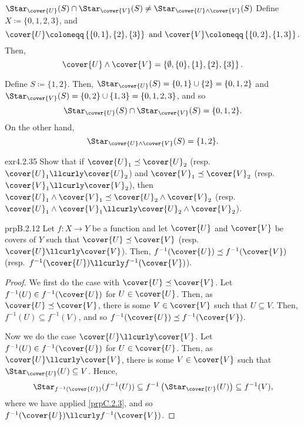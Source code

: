 \begin{exm}{$\Star _{\cover{U}}(S)\cap \Star _{\cover{V}}(S)\neq \Star _{\cover{U}\wedge \cover{V}}(S)$}{}
Define $X\coloneqq \{ 0,1,2,3\}$, and
\begin{equation}
\cover{U}\coloneqq \left\{ \{ 0,1\} ,\{ 2\} ,\{ 3\} \right\} \text{ and }\cover{V}\coloneqq \left\{ \{ 0,2\} ,\{ 1,3\} \right\} .
\end{equation}
Then,
\begin{equation}
\cover{U}\wedge \cover{V}=\left\{ \emptyset ,\{ 0\} ,\{ 1\} ,\{ 2\} ,\{ 3\} \right\} .
\end{equation}

Define $S\coloneqq \{ 1,2\}$.  Then, $\Star _{\cover{U}}(S)=\{ 0,1\} \cup \{ 2\} =\{ 0,1,2\}$ and $\Star _{\cover{V}}(S)=\{ 0,2\} \cup \{ 1,3\} =\{ 0,1,2,3\}$, and so
\begin{equation}
\Star _{\cover{U}}(S)\cap \Star _{\cover{V}}(S)=\{ 0,1,2\} .
\end{equation}
On the other hand,
\begin{equation}
\Star _{\cover{U}\wedge \cover{V}}(S)=\{ 1,2\} .
\end{equation}
\end{exm}
\begin{exr}{}{exr4.2.35}
Show that if $\cover{U}_1\preceq \cover{U}_2$ (resp.$\cover{U}_1\llcurly \cover{U}_2$) and $\cover{V}_1\preceq \cover{V}_2$ (resp.~$\cover{V}_1\llcurly \cover{V}_2$), then $\cover{U}_1\wedge \cover{V}_1\preceq \cover{U}_2\wedge \cover{V}_2$ (resp.~$\cover{U}_1\wedge \cover{V}_1\llcurly \cover{U}_2\wedge \cover{V}_2$).
\end{exr}
\begin{prp}{}{prpB.2.12}
Let $f\colon X\rightarrow Y$ be a function and let $\cover{U}$ and $\cover{V}$ be covers of $Y$ such that $\cover{U}\preceq \cover{V}$ (resp.~$\cover{U}\llcurly \cover{V}$).  Then, $f^{-1}(\cover{U})\preceq f^{-1}(\cover{V})$ (resp.~$f^{-1}(\cover{U})\llcurly f^{-1}(\cover{V})$).
\begin{proof}
We first do the case with $\cover{U}\preceq \cover{V}$.  Let $f^{-1}(U)\in f^{-1}(\cover{U})$ for $U\in \cover{U}$.  Then, as $\cover{U}\preceq \cover{V}$, there is some $V\in \cover{V}$ such that $U\subseteq V$.  Then, $f^{-1}(U)\subseteq f^{-1}(V)$, and so $f^{-1}(\cover{U})\preceq f^{-1}(\cover{V})$.

Now we do the case $\cover{U}\llcurly \cover{V}$.  Let $f^{-1}(U)\in f^{-1}(\cover{U})$ for $U\in \cover{U}$.  Then, as $\cover{U}\llcurly \cover{V}$, there is some $V\in \cover{V}$ such that $\Star _{\cover{U}}(U)\subseteq V$.  Hence,
\begin{equation}
\Star _{f^{-1}(\cover{U})}(f^{-1}(U))\subseteq f^{-1}\left( \Star _{\cover{U}}(U)\right) \subseteq f^{-1}(V),
\end{equation}
where we have applied \cref{prpC.2.3}, and so $f^{-1}(\cover{U})\llcurly f^{-1}(\cover{V})$.
\end{proof}
\end{prp}
